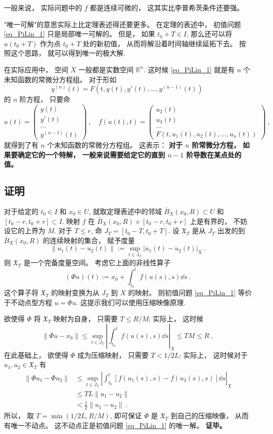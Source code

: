 一般来说， 实际问题中的 $f$ 都是连续可微的， 这其实比李普希茨条件还要强。

"唯一可解"的意思实际上比定理表述得还要更多。 在定理的表述中， 初值问题 \autoref{eq_PiLin_1} 只是局部唯一可解的。 但是， 如果 $t_0+T\in I$, 那么还可以将 $u(t_0+T)$ 作为点 $t_0+T$ 处的新初值， 从而将解沿着时间轴继续延拓下去。 按照这个思路， 就可以得到唯一的极大解.

在实际应用中， 空间 $X$ 一般都是实数空间 $\mathbb{R}^n$. 这时候 \autoref{eq_PiLin_1} 就是有 $n$ 个未知函数的常微分方程组。 对于形如
$$
y^{(n)}(t)=F(t,y(t),y'(t),...,y^{(n-1)}(t))~
$$
的 $n$ 阶方程， 只要命
$$
u(t)=\left(\begin{array}{c}
y(t)\\
y'(t)\\
...\\
y^{(n-1)}(t)
\end{array}
\right)~,\quad
f(u(t),t)=\left(\begin{array}{c}
u_2(t)\\
u_3(t)\\
...\\
F\left(t,u_1(t),u_2(t),...,u_n(t)\right)
\end{array}
\right)~,
$$
就得到了有 $n$ 个未知函数的常微分方程组。 这表示： \textbf{对于 $n$ 阶常微分方程， 如果要确定它的一个特解， 一般来说需要给定它的直到 $n-1$ 阶导数在某点处的值。}

\subsection{证明}
对于给定的 $t_0\in I$ 和 $x_0\in U$, 就取定理表述中的邻域 $\bar B_X(x_0,R)\subset U$ 和 $[t_0-r,t_0+r]\subset I$. 映射 $f$ 在 $\bar B_X(x_0,R)\times[t_0-r,t_0+r]$ 上是有界的， 不妨设它的上界为 $M$. 对于 $T\leq r$, 命 $J_T=[t_0-T,t_0+T]$. 设 $\mathfrak{X}_T$ 是从 $J_T$ 出发的到 $\bar B_X(x_0,R)$ 的连续映射的集合， 赋予度量
$$
\|u_1(t)-u_2(t)\|:=\sup_{t\in J_T}|u_1(t)-u_2(t)|_X~.
$$
则 $\mathfrak{X}_T$ 是一个完备度量空间。 考虑它上面的非线性算子
$$
(\Phi u)(t):=x_0+\int_{t_0}^tf(u(s),s)\dd s~.
$$ 
这个算子将 $\mathfrak{X}_T$ 的映射变换为从 $J_T$ 到 $X$ 的映射。 则初值问题 \autoref{eq_PiLin_1} 等价于不动点型方程 $u=\Phi u$. 这提示我们可以使用压缩映像原理.

欲使得 $\Phi$ 将 $\mathfrak{X}_T$ 映射为自身， 只需要 $T\leq R/M$; 实际上， 这时候
$$
\|\Phi u-x_0\|
\leq\sup_{t\in J_T}\left|\int_{t_0}^tf(u(s),s)\dd s\right|_X
\leq TM\leq R~,
$$
在此基础上， 欲使得 $\Phi$ 成为压缩映射， 只需要 $T<1/2L$; 实际上， 这时候对于 $u_1,u_2\in\mathfrak{X}_T$ 有
$$
\begin{aligned}
\|\Phi u_1-\Phi u_2\|
&\leq\sup_{t\in J_T}\left|\int_{t_0}^t[f(u_1(s),s)-f(u_2(s),s)]\dd s\right|_X \\
&\leq TL\|u_1-u_2\|\\
&<\frac{1}{2}\|u_1-u_2\|~.
\end{aligned}
$$
所以， 取 $T=\min\left(1/2L,R/M\right)$, 即可保证 $\Phi$ 是 $\mathfrak{X}_T$ 到自己的压缩映像， 从而有唯一不动点。 这不动点正是初值问题 \autoref{eq_PiLin_1} 的唯一解。 \textbf{证毕。}

